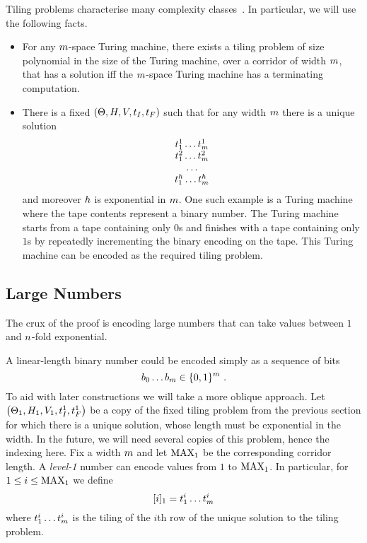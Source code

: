 Tiling problems characterise many complexity classes~\cite{??}.
In particular, we will use the following facts.
\begin{itemize}
\item
    For any $\linlen$-space Turing machine, there exists a tiling problem of size polynomial in the size of the Turing machine, over a corridor of width $\linlen$, that has a solution iff the $\linlen$-space Turing machine has a terminating computation.

\item
    There is a fixed
    $\tup{\tiles, \hrel, \vrel, \inittile, \fintile}$
    such that for any width $\linlen$ there is a unique solution
    \[
        \begin{array}{c}
            \tile^1_1 \ldots \tile^1_\linlen \\
            \tile^2_1 \ldots \tile^2_\linlen \\
            \ldots \\
            \tile^\tileheight_1 \ldots \tile^\tileheight_\linlen
        \end{array}
    \]
    and moreover $\tileheight$ is exponential in $\linlen$.
    One such example is a Turing machine where the tape contents represent a binary number.
    The Turing machine starts from a tape containing only $0$s and finishes with a tape containing only $1$s by repeatedly incrementing the binary encoding on the tape.
    This Turing machine can be encoded as the required tiling problem.
\end{itemize}

\subsection{Large Numbers}

The crux of the proof is encoding large numbers that can take values between $1$ and $\expheight$-fold exponential.

A linear-length binary number could be encoded simply as a sequence of bits
\[
    b_0 \ldots b_\linlen \in \set{0,1}^\linlen \ .
\]
To aid with later constructions we will take a more oblique approach.
Let
$\tup{\tilesnum{1}, \hrelnum{1}, \vrelnum{1}, \inittilenum{1}, \fintilenum{1}}$
be a copy of the fixed tiling problem from the previous section for which there is a unique solution, whose length must be exponential in the width.
In the future, we will need several copies of this problem, hence the indexing here.
Fix a width $\linlen$ and let $\nmax{1}$ be the corresponding corridor length.
A \emph{level-1} number can encode values from $1$ to $\nmax{1}$.
In particular, for $1 \leq i \leq \nmax{1}$ we define
\[
    \tenc{1}{i} = \tile^i_1 \ldots \tile^i_\linlen
\]
where
$\tile^i_1 \ldots \tile^i_\linlen$
is the tiling of the $i$th row of the unique solution to the tiling problem.

